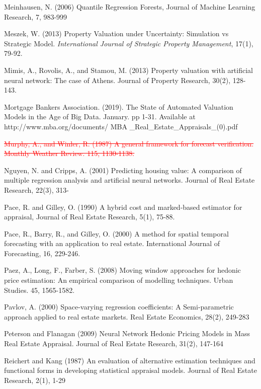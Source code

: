 \documentclass[colTwo]{anon}
\theoremstyle{definition}
\begin{document}
\begin{thebibliography}{50}
\harvarditem{}{}{}Meinhausen, N.  (2006) Quantile Regression Forests, Journal of Machine Learning Research, 7, 983-999

\harvarditem{}{}{}Meszek, W. (2013) Property Valuation under Uncertainty: Simulation vs Strategic Model. \textit{International Journal of Strategic Property Management}, 17(1), 79-92. 

\harvarditem{}{}{}Mimis, A., Rovolis, A., and Stamou, M. (2013) Property valuation with artificial neural network: The case of Athens. Journal of Property Research, 30(2), 128-143. 

\harvarditem{}{}{}Mortgage Bankers Association. (2019). The State of Automated Valuation Models in the Age of Big Data. January. pp 1-31. Available at http://www.mba.org/documents/ MBA \_Real\_Estate\_Appraisals\_(0).pdf

\harvarditem{}{}{} \textcolor{red}{\st{Murphy, A., and Winler, R. (1987) A general framework for forecast verification. Monthly Weather Review. 115, 1130-1138.}}

\harvarditem{}{}{}Nguyen, N. and Cripps, A. (2001) Predicting housing value: A comparison of multiple regression analysis and artificial neural networks. Journal of Real Estate Research, 22(3), 313-

\harvarditem{}{}{}Pace, R. and Gilley, O. (1990) A hybrid cost and marked-based estimator for appraisal, Journal of Real Estate Research, 5(1), 75-88. 

\harvarditem{}{}{}Pace, R., Barry, R., and Gilley, O. (2000) A method for spatial temporal forecasting with an application to real estate.  International Journal of Forecasting, 16, 229-246. 

\harvarditem{}{}{}Paez, A., Long, F., Farber, S. (2008) Moving window approaches for hedonic price estimation: An empirical comparison of modelling techniques. Urban Studies. 45, 1565-1582. 

\harvarditem{}{}{}Pavlov, A. (2000) Space-varying regression coefficients: A Semi-parametric approach applied to real estate markets. Real Estate Economics, 28(2), 249-283

\harvarditem{}{}{}Peterson and Flanagan (2009) Neural Network Hedonic Pricing Models in Mass Real Estate Appraisal. Journal of Real Estate Research,  31(2), 147-164

\harvarditem{}{}{}Reichert and Kang (1987) An evaluation of alternative estimation techniques and functional forms in developing statistical appraisal models. Journal of Real Estate Research, 2(1), 1-29


\end{thebibliography}
\end{document}
